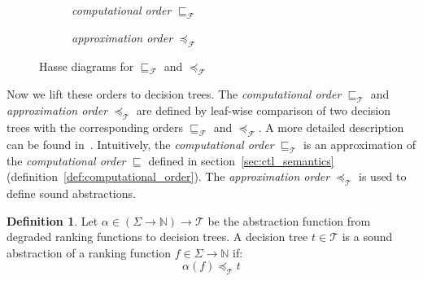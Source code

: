 \documentclass[11pt,a4paper,titlepage]{article}
\theoremstyle{definition}
\newtheorem{definition}{Definition}[section]
\begin{document}
\begin{figure}
    \begin{subfigure}[b]{0.5\textwidth}
        \centering
        \caption{\textit{computational order} $\sqsubseteq_{\mathcal{F}}$}
    \end{subfigure}
    \begin{subfigure}[b]{0.5\textwidth}
        \centering
        \caption{\textit{approximation order} $\preceq_{\mathcal{F}}$}
    \end{subfigure}
    \caption{Hasse diagrams for $\sqsubseteq_{\mathcal{F}}$ and $\preceq_{\mathcal{F}}$
    } 
    \label{fig:function_comp_approx_hasse}
\end{figure}

Now we lift these orders to decision trees. The \textit{computational order} $\sqsubseteq_{\mathcal{T}}$ 
and \textit{approximation order} $\preceq_{\mathcal{T}}$ are defined by leaf-wise comparison of two decision trees with the corresponding orders 
$\sqsubseteq_{\mathcal{F}}$ and $\preceq_{\mathcal{F}}$. A more detailed description can be found in~\cite{UrbanPhd}. 
Intuitively, the \textit{computational order} $\sqsubseteq_{\mathcal{T}}$ is an approximation of the \textit{computational order} $\sqsubseteq$ defined 
in section~\ref{sec:ctl_semantics} (definition~\ref{def:computational_order}).
The \textit{approximation order} $\preceq_{\mathcal{T}}$ is used to define sound abstractions.\\

\begin{definition}\label{def:sound_abstraction}
    Let $\alpha \in (\Sigma \rightarrow \mathbb{N}) \rightarrow \mathcal{T}$ be the abstraction function from degraded ranking functions to decision trees.
    A decision tree $t \in \mathcal{T}$ is a sound abstraction of a ranking function $f \in \Sigma \rightarrow \mathbb{N}$ if:
    \[\alpha(f) \preceq_{\mathcal{T}} t \]
\end{definition}
\end{document}
